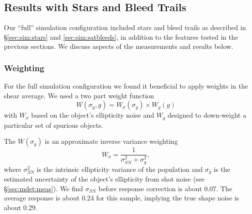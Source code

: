 \documentclass[twocolumn,twocolappendix,astrosym]{openjournal}
\begin{document}
\subsection{Results with Stars and Bleed Trails} \label{sec:results:full}

Our ``full'' simulation configuration included stars and bleed trails as
described in \S \ref{sec:sim:stars} and \ref{sec:sim:satbleeds}, in addition to
the features tested in the previous sections.  We discuss aspects of the
measurements and results below.

\subsubsection{Weighting}

For the full simulation configuration we found it beneficial to apply weights
in the shear average.  We used a two part weight function
\begin{equation}
    W(\sigma_g, g) = W_\sigma (\sigma_g) \times W_g(g)
\end{equation}
with $W_\sigma$ based on the object's ellipticity noise and $W_g$ designed to
down-weight a particular set of spurious objects.

The $W(\sigma_g)$ is an approximate inverse variance weighting
\begin{equation}
    W_\sigma = \frac{1}{\sigma_{SN}^2 + \sigma_g^2},
\end{equation}
where $\sigma^2_{SN}$ is the intrinsic ellipticity variance of the population
and $\sigma_g$ is the estimated uncertainty of the object's ellipticity from
shot noise (see \S \ref{sec:mdet:meas}).  We find $\sigma_{SN}$ before
response correction is about 0.07.  The average response is about 0.24 for this
sample, implying the true shape noise is about 0.29.
\end{document}
